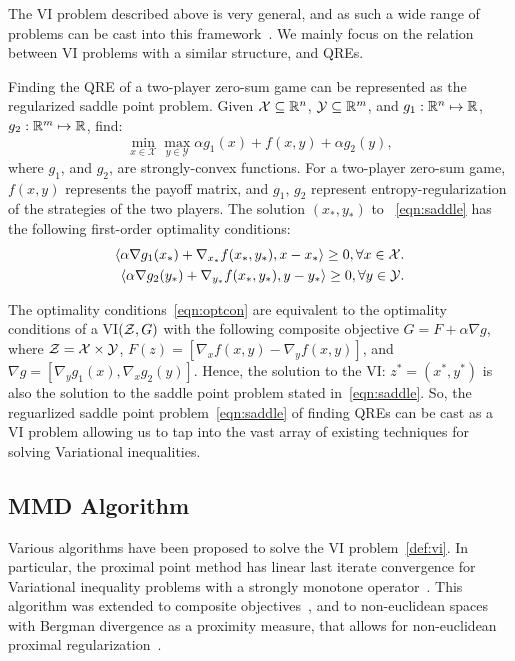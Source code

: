 The VI problem described above is very general, and as such a wide range of problems can be cast
into this framework~\cite{facchineiFiniteDimensional2004}.
We mainly focus on the relation between VI problems with a similar structure, and QREs.

Finding the QRE of a two-player zero-sum game can be represented as the regularized saddle point
problem.
Given $\mathcal{X} \subseteq \mathbb{R}^n$, $\mathcal{Y} \subseteq \mathbb{R}^m$, and $g_1: \mathbb{R}^n \mapsto \mathbb{R}$, $g_2: \mathbb{R}^m
	\mapsto \mathbb{R}$, find:
\begin{equation}
	\label{eqn:saddle} \min_{x \in \mathcal{X}} \max_{y \in
		\mathcal{Y}} \alpha g_1(x) + f(x, y) + \alpha g_2(y),
\end{equation} where $g_1$, and $g_2$, are
strongly-convex functions.
For a two-player zero-sum game, $f(x, y)$ represents the payoff matrix, and $g_1$, $g_2$ represent
entropy-regularization of the strategies of the two players.
The solution $(x_{\ast}, y_{\ast})$ to~ \ref{eqn:saddle} has the following first-order optimality
conditions:
\begin{equation}
	\label{eqn:optcon}
	\begin{split}
		\langle \alpha \nabla g_1(x_*) +
		\nabla_{x_*} f(x_*, y_*), x - x_* \rangle \geq 0, \forall x \in \mathcal{X}.
		\\
		\langle \alpha \nabla g_2(y_*) +
		\nabla_{y_*} f(x_*, y_*),
		y - y_* \rangle \geq 0, \forall y \in \mathcal{Y}.
	\end{split}
\end{equation}

The optimality conditions~\ref{eqn:optcon} are equivalent to the optimality conditions of a
VI$(\mathcal{Z}, G)$ with the following composite objective $G = F + \alpha \nabla g$, where $\mathcal{Z} =
	\mathcal{X} \times \mathcal{Y}$, $F(z) = [\nabla_x f(x,y) - \nabla_y f(x,y)]$, and $\nabla g =
	[\nabla_y g_1(x), \nabla_x g_2(y)]$.
Hence, the solution to the VI: $z^* = (x^*, y^*)$ is also the solution to the saddle point problem
stated in~\ref{eqn:saddle}.
So, the reguarlized saddle point problem~\ref{eqn:saddle} of finding QREs can be cast as a VI
problem allowing us to tap into the vast array of existing techniques for solving Variational
inequalities.

\subsection{MMD Algorithm}
Various algorithms have been proposed to solve the VI problem~\ref{def:vi}.
In particular, the proximal point method has linear last iterate convergence for Variational
inequality problems with a strongly monotone operator~\cite{rockafellarMonotone1976}.
This algorithm was extended to composite objectives~\cite{tsenglinear1995}, and to non-euclidean
spaces with Bergman divergence as a proximity measure, that allows for non-euclidean proximal
regularization~\cite{tsengApproximation2010}.

